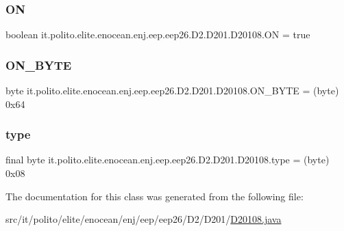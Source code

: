 \subsubsection{\texorpdfstring{ON}{ON}}
{\footnotesize\ttfamily boolean it.\+polito.\+elite.\+enocean.\+enj.\+eep.\+eep26.\+D2.\+D201.\+D20108.\+ON = true\hspace{0.3cm}{\ttfamily [static]}}

\hypertarget{classit_1_1polito_1_1elite_1_1enocean_1_1enj_1_1eep_1_1eep26_1_1_d2_1_1_d201_1_1_d20108_aae1223c108c72c3e0d8536e7fe60304c}{}\label{classit_1_1polito_1_1elite_1_1enocean_1_1enj_1_1eep_1_1eep26_1_1_d2_1_1_d201_1_1_d20108_aae1223c108c72c3e0d8536e7fe60304c} 
\subsubsection{\texorpdfstring{O\+N\+\_\+\+B\+Y\+TE}{ON\_BYTE}}
{\footnotesize\ttfamily byte it.\+polito.\+elite.\+enocean.\+enj.\+eep.\+eep26.\+D2.\+D201.\+D20108.\+O\+N\+\_\+\+B\+Y\+TE = (byte) 0x64\hspace{0.3cm}{\ttfamily [static]}}

\hypertarget{classit_1_1polito_1_1elite_1_1enocean_1_1enj_1_1eep_1_1eep26_1_1_d2_1_1_d201_1_1_d20108_afe5e816ada440b041c6af8f0ac3ca60d}{}\label{classit_1_1polito_1_1elite_1_1enocean_1_1enj_1_1eep_1_1eep26_1_1_d2_1_1_d201_1_1_d20108_afe5e816ada440b041c6af8f0ac3ca60d} 
\subsubsection{\texorpdfstring{type}{type}}
{\footnotesize\ttfamily final byte it.\+polito.\+elite.\+enocean.\+enj.\+eep.\+eep26.\+D2.\+D201.\+D20108.\+type = (byte) 0x08\hspace{0.3cm}{\ttfamily [static]}}



The documentation for this class was generated from the following file\+:\begin{DoxyCompactItemize}
\item 
src/it/polito/elite/enocean/enj/eep/eep26/\+D2/\+D201/\hyperlink{_d20108_8java}{D20108.\+java}\end{DoxyCompactItemize}
